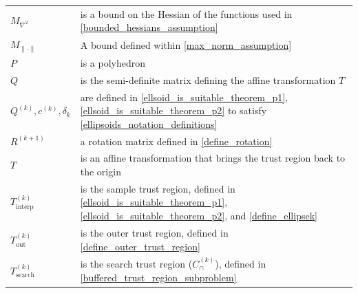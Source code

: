 \documentclass{article}
\theoremstyle{case}
\numberwithin{theorem}{subsection}
\newcommand{\capcones}{{C^{(k)}_{\cap}}}
\newcommand{\ck}{{c^{(k)}}}
\newcommand{\maxhessian}{{M_{\nabla^2}}}
\newcommand{\maxnorm}{{M_{\|\cdot\|}}}
\newcommand{\outertrk}{{T_{\text{out}}^{(k)}}}
\newcommand{\qk}{{Q^{(k)}}}
\newcommand{\rotk}{{R^{(k+1)}}}
\newcommand{\sampletrk}{{T_{\text{interp}}^{(k)}}}
\newcommand{\sdk}{{\delta_k}}
\newcommand{\searchtrk}{{T_{\text{search}}^{(k)}}}
\begin{document}
\begin{longtable}{| p{} | p{} |}
$\maxhessian$ & is a bound on the Hessian of the functions used in \cref{bounded_hessians_assumption} \\ %
$\maxnorm $ & A bound defined within \cref{max_norm_assumption} \\ %
$P$ & is a polyhedron \\ %
$Q$ & is the semi-definite matrix defining the affine transformation $T$ \\ %
$\qk, \ck, \sdk$ & are defined in \cref{ellsoid_is_suitable_theorem_p1}, \cref{ellsoid_is_suitable_theorem_p2} to satisfy \cref{ellipsoids_notation_definitions} \\ %
$\rotk$ & a rotation matrix defined in \cref{define_rotation} \\ %
$T$ & is an affine transformation that brings the trust region back to the origin \\ %
$\sampletrk $           & is the sample trust region, defined in \cref{ellsoid_is_suitable_theorem_p1}, \cref{ellsoid_is_suitable_theorem_p2}, and \cref{define_ellipsek} \\ %
$\outertrk $            & is the outer trust region, defined in \cref{define_outer_trust_region} \\ %
$\searchtrk $           & is the search trust region ($\capcones$), defined in \cref{buffered_trust_region_subproblem} \\ %

\end{longtable}
\end{document}
